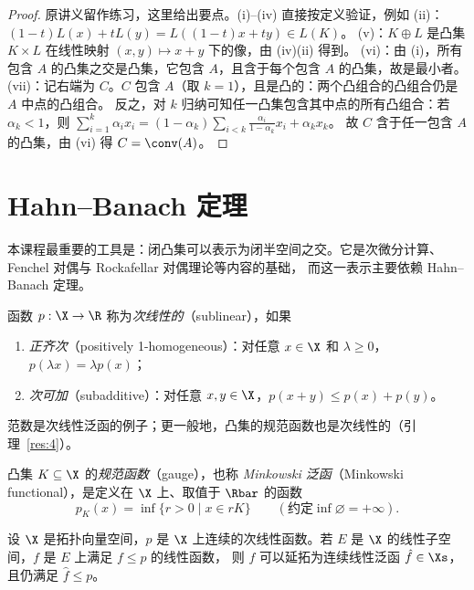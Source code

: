 \begin{proof}
原讲义留作练习，这里给出要点。(i)--(iv) 直接按定义验证，例如 (ii)：$(1-t)L(x)+tL(y)=L((1-t)x+ty)\in L(K)$。
(v)：$K\oplus L$ 是凸集 $K\times L$ 在线性映射 $(x,y)\mapsto x+y$ 下的像，由 (iv)(ii) 得到。
(vi)：由 (i)，所有包含 $A$ 的凸集之交是凸集，它包含 $A$，且含于每个包含 $A$ 的凸集，故是最小者。
(vii)：记右端为 $C$。$C$ 包含 $A$（取 $k=1$），且是凸的：两个凸组合的凸组合仍是 $A$ 中点的凸组合。
反之，对 $k$ 归纳可知任一凸集包含其中点的所有凸组合：若 $\alpha_k<1$，则
$\sum_{i=1}^k\alpha_ix_i=(1-\alpha_k)\sum_{i<k}\frac{\alpha_i}{1-\alpha_k}x_i+\alpha_kx_k$。
故 $C$ 含于任一包含 $A$ 的凸集，由 (vi) 得 $C=\conv(A)$。
\end{proof}

\section{Hahn--Banach 定理}

本课程最重要的工具是：闭凸集可以表示为闭半空间之交。它是次微分计算、Fenchel 对偶与 Rockafellar 对偶理论等内容的基础，
而这一表示主要依赖 Hahn--Banach 定理。

\begin{definition}[次线性]
\label{def:4}
函数 $p:\X\to\R$ 称为\emph{次线性的}（sublinear），如果
\begin{enumerate}[label=(\roman*)]
  \item \emph{正齐次}（positively 1-homogeneous）：对任意 $x\in\X$ 和 $\lambda\geqslant0$，$p(\lambda x)=\lambda p(x)$；
  \item \emph{次可加}（subadditive）：对任意 $x,y\in\X$，$p(x+y)\leqslant p(x)+p(y)$。
\end{enumerate}
\end{definition}

范数是次线性泛函的例子；更一般地，凸集的规范函数也是次线性的（引理~\ref{res:4}）。

\begin{definition}[规范函数]
\label{def:5}
凸集 $K\subseteq\X$ 的\emph{规范函数}（gauge），也称 \emph{Minkowski 泛函}（Minkowski functional），是定义在 $\X$ 上、取值于 $\Rbar$ 的函数
\[
  p_K(x)=\inf\{r>0\mid x\in rK\}\qquad(\text{约定}\inf\varnothing=+\infty).
\]
\end{definition}

\begin{theorem}
\label{res:2}
设 $\X$ 是拓扑向量空间，$p$ 是 $\X$ 上连续的次线性函数。若 $E$ 是 $\X$ 的线性子空间，$f$ 是 $E$ 上满足 $f\leqslant p$ 的线性函数，
则 $f$ 可以延拓为连续线性泛函 $\hat f\in\Xs$，且仍满足 $\hat f\leqslant p$。
\end{theorem}

